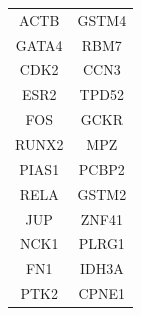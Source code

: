 \documentclass[ppgc, diss, english]{iiufrgs}
\begin{document}
\begin{table}[!bh]
\begin{tabular}{cc}
ACTB                                                                                       & GSTM4                                                                                         \\
GATA4                                                                                      & RBM7                                                                                          \\
CDK2                                                                                       & CCN3                                                                                          \\
ESR2                                                                                       & TPD52                                                                                         \\
FOS                                                                                        & GCKR                                                                                          \\
RUNX2                                                                                      & MPZ                                                                                           \\
PIAS1                                                                                      & PCBP2                                                                                         \\
RELA                                                                                       & GSTM2                                                                                         \\
JUP                                                                                        & ZNF41                                                                                         \\
NCK1                                                                                       & PLRG1                                                                                         \\
FN1                                                                                        & IDH3A                                                                                         \\
PTK2                                                                                       & CPNE1                                                                                         \\

\end{tabular}
\end{table}
\end{document}
